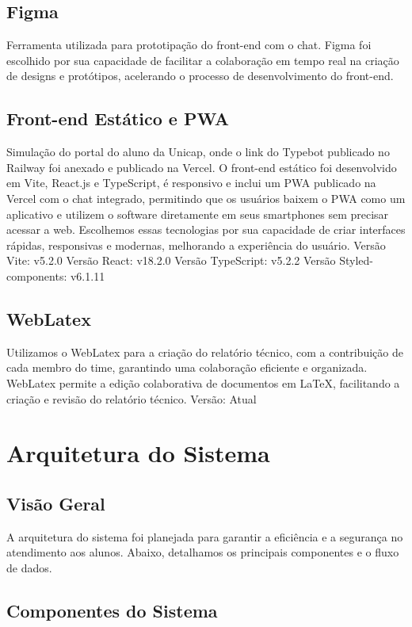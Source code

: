 \documentclass[12pt,a4paper]{article} %
\begin{document}
\subsection{Figma}
Ferramenta utilizada para prototipação do front-end com o chat. Figma foi escolhido por sua capacidade de facilitar a colaboração em tempo real na criação de designs e protótipos, acelerando o processo de desenvolvimento do front-end.

\subsection{Front-end Estático e PWA}
Simulação do portal do aluno da Unicap, onde o link do Typebot publicado no Railway foi anexado e publicado na Vercel. O front-end estático foi desenvolvido em Vite, React.js e TypeScript, é responsivo e inclui um PWA publicado na Vercel com o chat integrado, permitindo que os usuários baixem o PWA como um aplicativo e utilizem o software diretamente em seus smartphones sem precisar acessar a web. Escolhemos essas tecnologias por sua capacidade de criar interfaces rápidas, responsivas e modernas, melhorando a experiência do usuário. Versão Vite: v5.2.0 Versão React: v18.2.0 Versão TypeScript: v5.2.2 Versão Styled-components: v6.1.11

\subsection{WebLatex}
Utilizamos o WebLatex para a criação do relatório técnico, com a contribuição de cada membro do time, garantindo uma colaboração eficiente e organizada. WebLatex permite a edição colaborativa de documentos em LaTeX, facilitando a criação e revisão do relatório técnico. Versão: Atual

\section{Arquitetura do Sistema}

\subsection{Visão Geral}
A arquitetura do sistema foi planejada para garantir a eficiência e a segurança no atendimento aos alunos. Abaixo, detalhamos os principais componentes e o fluxo de dados.

\subsection{Componentes do Sistema}
\end{document}
